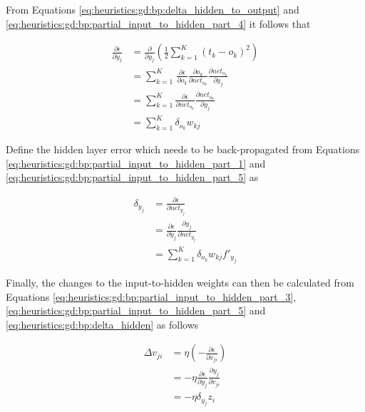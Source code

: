 From Equations \ref{eq:heuristics:gd:bp:delta_hidden_to_output} and \ref{eq:heuristics:gd:bp:partial_input_to_hidden_part_4} it follows that

\begin{equation}
    \label{eq:heuristics:gd:bp:partial_input_to_hidden_part_5}
    \begin{split}
        \frac{\partial \epsilon}{\partial y_{j}}
        &= \frac{\partial}{\partial y_{j}}\left( \frac{1}{2} \sum^{K}_{k=1} (t_{k} - o_{k})^{2} \right)\\
        &= \sum^{K}_{k=1}\frac{}{} \frac{\partial \epsilon}{\partial o_{k}} \frac{\partial o_{k}}{\partial net_{o_{k}}} \frac{\partial net_{o_{k}}}{\partial y_{j}}\\
        &= \sum^{K}_{k=1} \frac{\partial \epsilon}{\partial net_{o_{k}}} \frac{\partial net_{o_{k}}}{\partial y_{j}}\\
        &= \sum^{K}_{k=1} \delta_{o_{k}}w_{kj}
    \end{split}
\end{equation}

Define the hidden layer error which needs to be back-propagated from Equations \ref{eq:heuristics:gd:bp:partial_input_to_hidden_part_1} and \ref{eq:heuristics:gd:bp:partial_input_to_hidden_part_5} as

\begin{equation}
    \label{eq:heuristics:gd:bp:delta_hidden}
    \begin{split}
        \delta_{y_{j}}
        &= \frac{\partial \epsilon}{\partial net_{y_{j}}}\\
        &= \frac{\partial \epsilon}{\partial y_{j}} \frac{\partial y_{j}}{\partial net_{y_{j}}}\\
        &= \sum^{K}_{k=1}\delta_{o_{k}}w_{kj}f'_{y_{j}}
    \end{split}
\end{equation}

Finally, the changes to the input-to-hidden weights can then be calculated from Equations \ref{eq:heuristics:gd:bp:partial_input_to_hidden_part_3}, \ref{eq:heuristics:gd:bp:partial_input_to_hidden_part_5} and \ref{eq:heuristics:gd:bp:delta_hidden} as follows

\begin{equation}
    \label{eq:heuristics:gd:bp:delta_input_to_hidden}
    \begin{split}
        \Delta v_{ji}
        &= \eta \left( - \frac{\partial \epsilon}{\partial v_{ji}} \right)\\
        &= -\eta \frac{\partial \epsilon}{\partial y_{j}} \frac{\partial y_{j}}{\partial v_{ji}}\\
        &= -\eta \delta_{y_{j}}z_{i}
    \end{split}
\end{equation}

